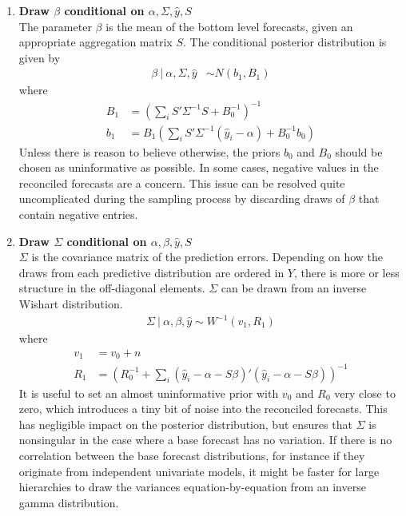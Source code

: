 \documentclass[a4paper,fleqn,11pt]{article}
\begin{document}
\begin{enumerate}
\item \textbf{Draw $\beta$ conditional on $\alpha,\Sigma,\hat{y},S$}\\
The parameter $\beta$ is the mean of the bottom level forecasts, given an appropriate aggregation matrix $S$. The conditional posterior distribution is given by
\begin{align}
\beta\ |\ \alpha,\Sigma,\hat{y} &\sim N(b_1,B_1)
\end{align}
where
\begin{align*}
B_1 &= \left(\sum_i S'\Sigma^{-1}S + B_0^{-1}\right)^{-1} \\
b_1 &= B_1 \left(\sum_i S'\Sigma^{-1} (\hat{y}_i - \alpha) + B_0^{-1}b_0\right)
\end{align*}
Unless there is reason to believe otherwise, the priors $b_0$ and $B_0$ should be chosen as uninformative as possible. In some cases, negative values in the reconciled forecasts are a concern. This issue can be resolved quite uncomplicated during the sampling process by discarding draws of $\beta$ that contain negative entries.\\

\item \textbf{Draw $\Sigma$ conditional on $\alpha,\beta,\hat{y},S$}\\
$\Sigma$ is the covariance matrix of the prediction errors. Depending on how the draws from each predictive distribution are ordered in $Y$, there is more or less structure in the off-diagonal elements. $\Sigma$ can be drawn from an inverse Wishart distribution.
\begin{align}
\Sigma\ |\ \alpha,\beta,\hat{y} \sim W^{-1}(v_1,R_1)
\end{align}
where
\begin{align*}
v_1 &= v_0 + n\\
R_1 &=  \left( R_0^{-1} + \sum_i (\hat{y}_i - \alpha - S \beta)'(\hat{y}_i - \alpha - S \beta) \right)^{-1}
\end{align*}
It is useful to set an almost uninformative prior with $v_0$ and $R_0$ very close to zero, which introduces a tiny bit of noise into the reconciled forecasts. This has negligible impact on the posterior distribution, but ensures that $\Sigma$ is nonsingular in the case where a base forecast has no variation. If there is no correlation between the base forecast distributions, for instance if they originate from independent univariate models, it might be faster for large hierarchies to draw the variances equation-by-equation from an inverse gamma distribution.\\


\end{enumerate}
\end{document}
